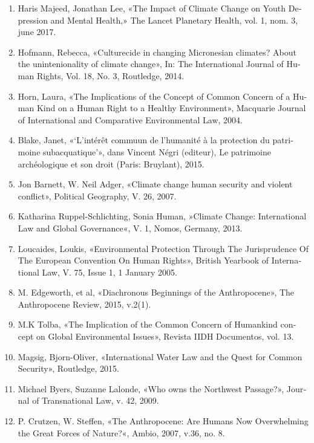 {\begin{latin}
{\begin{enumerate}
		  
		\item Haris Majeed, Jonathan Lee, «The Impact of Climate Change on Youth Depression and Mental Health,» The Lancet Planetary Health, vol. 1, nom. 3, june 2017.
		
		\item Hofmann, Rebecca, «Culturecide in changing Micronesian climates? About the unintenionality of climate change», In: The International Journal of Human Rights, Vol. 18, No. 3, Routledge, 2014.
		
		\item Horn, Laura, «The Implications of the Concept of Common Concern of a Human Kind on a Human Right to a Healthy Environment», Macquarie Journal of International and Comparative Environmental Law, 2004.
		
		\item Blake, Janet, «‘L’intérêt commuun de l’humanité à la protection du patrimoine subacquatique’», dans Vincent Négri (editeur), Le patrimoine archéologique et son droit (Paris: Bruylant), 2015.
		
		\item Jon Barnett, W. Neil Adger, «Climate change human security and violent conflict», Political Geography, V. 26, 2007.
		
		\item Katharina Ruppel-Schlichting, Sonia Human, »Climate Change: International Law and Global Governance«, V. 1, Nomos, Germany, 2013.
		
		\item Loucaides, Loukis, «Environmental Protection Through The Jurisprudence Of The European Convention On Human Rights», British Yearbook of International Law, V. 75, Issue 1, 1 January 2005.
		
		\item M. Edgeworth, et al, «Diachronous Beginnings of the Anthropocene», The Anthropocene Review, 2015, v.2(1).
		\item M.K Tolba, «The Implication of the Common Concern of Humankind concept on Global Environmental Issues», Revista IIDH Documentos, vol. 13.
		\item Magsig, Bjorn-Oliver, «International Water Law and the Quest for Common Security», Routledge, 2015.
		
		\item Michael Byers, Suzanne Lalonde, «Who owns the Northwest Passage?», Journal of Transnational Law, v. 42, 2009.
		
		\item P. Crutzen, W. Steffen, «The Anthropocene: Are Humans Now Overwhelming the Great Forces of Nature?«, Ambio, 2007, v.36, no. 8.
		

\end{enumerate}}
\end{latin}}
